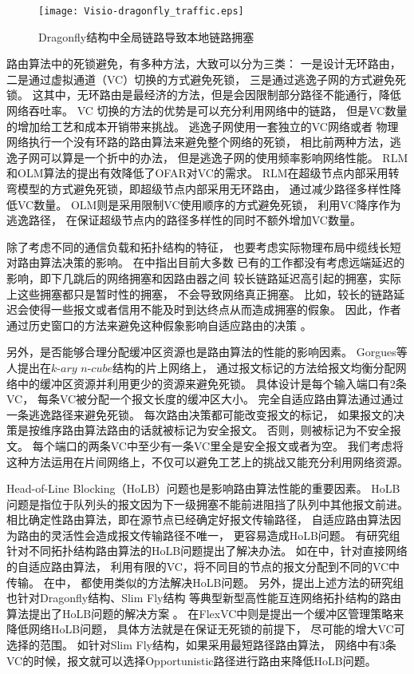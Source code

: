 \begin{figure}[htp]
  \centering
    \texttt{[image: Visio-dragonfly\_traffic.eps]}
    \caption{Dragonfly结构中全局链路导致本地链路拥塞}
       \label{dragonflytr}
\end{figure}

路由算法中的死锁避免，有多种方法，大致可以分为三类：
一是设计无环路由，二是通过虚拟通道（VC）切换的方式避免死锁，
三是通过逃逸子网的方式避免死锁。
这其中，无环路由是最经济的方法，但是会因限制部分路径不能通行，降低网络吞吐率。
VC 切换的方法的优势是可以充分利用网络中的链路，
但是VC数量的增加给工艺和成本开销带来挑战。
逃逸子网使用一套独立的VC网络或者
物理网络执行一个没有环路的路由算法来避免整个网络的死锁，
相比前两种方法，逃逸子网可以算是一个折中的办法，
但是逃逸子网的使用频率影响网络性能。
RLM 和OLM算法的提出有效降低了OFAR对VC的需求。
RLM在超级节点内部采用转弯模型的方式避免死锁，即超级节点内部采用无环路由，
通过减少路径多样性降低VC数量。
OLM则是采用限制VC使用顺序的方式避免死锁，
利用VC降序作为逃逸路径，
在保证超级节点内的路径多样性的同时不额外增加VC数量。

除了考虑不同的通信负载和拓扑结构的特征，
也要考虑实际物理布局中缆线长短对路由算法决策的影响。
在中指出目前大多数
已有的工作都没有考虑远端延迟的影响，即下几跳后的网络拥塞和因路由器之间
较长链路延迟高引起的拥塞，实际上这些拥塞都只是暂时性的拥塞，
不会导致网络真正拥塞。
比如，较长的链路延迟会使得一些报文或者信用不能及时到达终点从而造成拥塞的假象。
因此，作者通过历史窗口的方法来避免这种假象影响自适应路由的决策
。

另外，是否能够合理分配缓冲区资源也是路由算法的性能的影响因素。
Gorgues等人提出在$k\textrm{-}ary$ $n\textrm{-}cube$结构的片上网络上，
通过报文标记的方法给报文均衡分配网络中的缓冲区资源并利用更少的资源来避免死锁。
具体设计是每个输入端口有2条VC，
每条VC被分配一个报文长度的缓冲区大小。
完全自适应路由算法通过通过一条逃逸路径来避免死锁。
每次路由决策都可能改变报文的标记，
如果报文的决策是按维序路由算法路由的话就被标记为安全报文。
否则，则被标记为不安全报文。
每个端口的两条VC中至少有一条VC里全是安全报文或者为空。
我们考虑将这种方法运用在片间网络上，不仅可以避免工艺上的挑战又能充分利用网络资源。

Head-of-Line Blocking（HoLB）问题也是影响路由算法性能的重要因素。
HoLB问题是指位于队列头的报文因为下一级拥塞不能前进阻挡了队列中其他报文前进。
相比确定性路由算法，即在源节点已经确定好报文传输路径，
自适应路由算法因为路由的灵活性会造成报文传输路径不唯一，
更容易造成HoLB问题。
有研究组针对不同拓扑结构路由算法的HoLB问题提出了解决办法。
如在中，针对直接网络的自适应路由算法，
利用有限的VC，将不同目的节点的报文分配到不同的VC中传输。
在中，
都使用类似的方法解决HoLB问题。
另外，提出上述方法的研究组也针对Dragonfly结构、Slim Fly结构
等典型新型高性能互连网络拓扑结构的路由算法提出了HoLB问题的解决方案
。
在FlexVC中则是提出一个缓冲区管理策略来降低网络HoLB问题，
具体方法就是在保证无死锁的前提下，
尽可能的增大VC可选择的范围。
如针对Slim Fly结构，如果采用最短路径路由算法，
网络中有3条VC的时候，报文就可以选择Opportunistic路径进行路由来降低HoLB问题。

